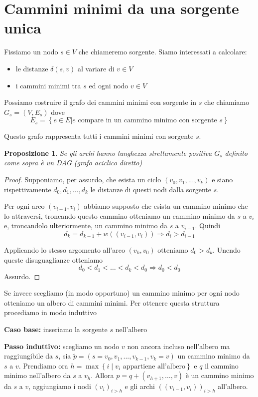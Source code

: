 \documentclass[a4paper,10pt]{amsbook}
\newcounter{counter1}
\theoremstyle{plain}
\newtheorem{mypro}[counter1]{Proposizione}
\theoremstyle{definition}
\theoremstyle{remark}
\newcommand{\set}[1]{\left\{#1\right\}}
\newcommand{\pa}[1]{\left(#1\right)}
\begin{document}
\section{Cammini minimi da una sorgente unica}

Fissiamo un nodo $s \in V$ che chiameremo sorgente. Siamo interessati
a calcolare:
\begin{itemize}
\item le distanze $\delta(s,v)$ al variare di $v\in V$
\item i cammini minimi tra $s$ ed ogni nodo $v\in V$
\end{itemize}

Possiamo costruire il grafo dei cammini minimi con sorgente in $s$ che
chiamiamo $G_s = (V,E_s)$ dove
\[ E_s = \set{ e\in E | e\text{ compare in un cammino minimo con
    sorgente }s} \]

Questo grafo rappresenta tutti i cammini minimi con sorgente $s$.

\begin{mypro}
  Se gli archi hanno lunghezza strettamente positiva $G_s$ definito
  come sopra è un DAG (grafo aciclico diretto)
\end{mypro}
\begin{proof}
  Supponiamo, per assurdo, che esista un ciclo $(v_0,v_1,...,v_k)$ e
  siano rispettivamente $d_0,d_1,...,d_k$ le distanze di questi nodi
  dalla sorgente $s$.

  Per ogni arco $(v_{i-1},v_i)$ abbiamo supposto che esista un cammino
  minimo che lo attraversi, troncando questo cammino otteniamo un
  cammino minimo da $s$ a $v_i$ e, troncandolo ulteriormente, un
  cammino minimo da $s$ a $v_{i-1}$. Quindi
  \[ d_k = d_{k-1} + w\pa{ (v_{i-1} , v_i ) } \Rightarrow d_i >
  d_{i-1} \]
  
  Applicando lo stesso argomento all'arco $(v_k,v_0)$ otteniamo $d_0 >
  d_k$. Unendo queste disuguaglianze otteniamo
  \[ d_0 < d_1 < \dots < d_k < d_0 \Rightarrow d_0 < d_0 \]
  Assurdo.
\end{proof}

Se invece scegliamo (in modo opportuno) un cammino minimo per ogni
nodo otteniamo un albero di cammini minimi. Per ottenere questa
struttura procediamo in modo induttivo

\textbf{Caso base:} inseriamo la sorgente $s$ nell'albero

\textbf{Passo induttivo:} scegliamo un nodo $v$ non ancora incluso
nell'albero ma raggiungibile da $s$, sia $\tilde p = (s=v_0,v_1,...,
v_{k-1}, v_k=v)$ un cammino minimo da $s$ a $v$. Prendiamo ora $h =
\max\set{ i \mid v_i \text{ appartiene all'albero}}$ e $q$ il cammino
minimo nell'albero da $s$ a $v_h$. Allora $p = q + (v_{h+1}, \dots ,
v)$ è un cammino minimo da $s$ a $v$, aggiungiamo i nodi $\pa{ v_i }
_{i>h}$ e gli archi $\pa{(v_{i-1},v_i)}_{i>h}$ all'albero.
\end{document}
